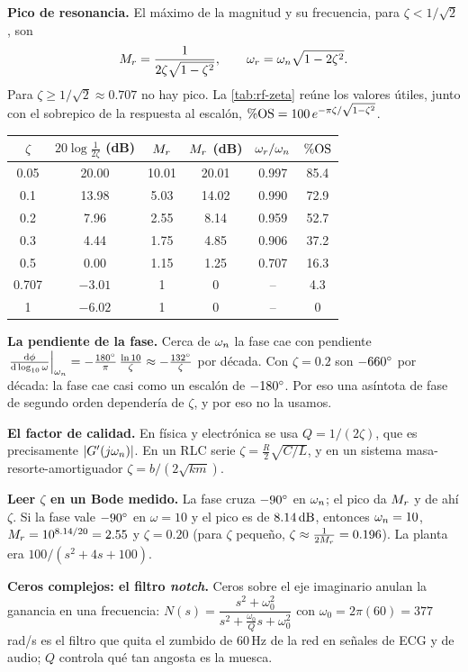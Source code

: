 \begin{profundiza}
\textbf{Pico de resonancia.} El máximo de la magnitud y su frecuencia, para $\zeta<1/\sqrt2$, son
\begin{equation}
  M_r=\frac{1}{2\zeta\sqrt{1-\zeta^2}},\qquad \omega_r=\omega_n\sqrt{1-2\zeta^2}.
  \label{eq:rf-Mr}
\end{equation}
Para $\zeta\geq1/\sqrt2\approx0.707$ no hay pico. La \cref{tab:rf-zeta} reúne los valores útiles, junto con el sobrepico de la respuesta al escalón, $\%\mathrm{OS}=100\,e^{-\pi\zeta/\sqrt{1-\zeta^2}}$.

\begin{center}\small
\begin{tabular}{@{}cccccc@{}}
\toprule
$\zeta$ & $20\log\frac{1}{2\zeta}$ (dB) & $M_r$ & $M_r$ (dB) & $\omega_r/\omega_n$ & $\%\mathrm{OS}$\\
\midrule
0.05 & 20.00 & 10.01 & 20.01 & 0.997 & 85.4\\
0.1  & 13.98 & 5.03 & 14.02 & 0.990 & 72.9\\
0.2  & 7.96  & 2.55 & 8.14  & 0.959 & 52.7\\
0.3  & 4.44  & 1.75 & 4.85  & 0.906 & 37.2\\
0.5  & 0.00  & 1.15 & 1.25  & 0.707 & 16.3\\
0.707& $-3.01$ & 1 & 0 & -- & 4.3\\
1    & $-6.02$ & 1 & 0 & -- & 0\\
\bottomrule
\end{tabular}
\label{tab:rf-zeta}
\end{center}

\textbf{La pendiente de la fase.} Cerca de $\omega_n$ la fase cae con pendiente
$\left.\frac{\mathrm{d}\phi}{\mathrm{d}\log_{10}\omega}\right|_{\omega_n}=-\frac{180^{\circ}}{\pi}\,\frac{\ln10}{\zeta}\approx-\frac{132^{\circ}}{\zeta}$ por década. Con $\zeta=0.2$ son $-660^{\circ}$ por década: la fase cae casi como un escalón de $-180^{\circ}$. Por eso una asíntota de fase de segundo orden dependería de $\zeta$, y por eso no la usamos.

\textbf{El factor de calidad.} En física y electrónica se usa $Q=1/(2\zeta)$, que es precisamente $|G'(j\omega_n)|$. En un RLC serie $\zeta=\frac{R}{2}\sqrt{C/L}$, y en un sistema masa-resorte-amortiguador $\zeta=b/(2\sqrt{km})$.

\textbf{Leer $\zeta$ en un Bode medido.} La fase cruza $-90^{\circ}$ en $\omega_n$; el pico da $M_r$ y de ahí $\zeta$. Si la fase vale $-90^{\circ}$ en $\omega=10$ y el pico es de $8.14\,\mathrm{dB}$, entonces $\omega_n=10$, $M_r=10^{8.14/20}=2.55$ y $\zeta=0.20$ (para $\zeta$ pequeño, $\zeta\approx\frac{1}{2M_r}=0.196$). La planta era $100/(s^2+4s+100)$.

\textbf{Ceros complejos: el filtro \emph{notch}.} Ceros sobre el eje imaginario anulan la ganancia en una frecuencia: $N(s)=\dfrac{s^2+\omega_0^2}{s^2+\frac{\omega_0}{Q}s+\omega_0^2}$ con $\omega_0=2\pi(60)=377$\,rad/s es el filtro que quita el zumbido de $60$\,Hz de la red en señales de ECG y de audio; $Q$ controla qué tan angosta es la muesca.
\end{profundiza}

